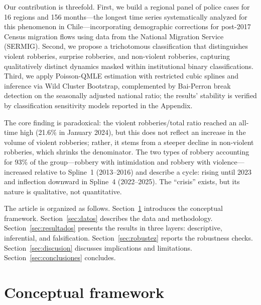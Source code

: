 \documentclass[pdflatex,sn-basic]{sn-jnl}
\begin{document}
Our contribution is threefold. First, we build a regional panel of police cases for
16 regions and 156 months---the longest time series systematically analyzed for this
phenomenon in Chile---incorporating demographic corrections for post-2017 Census migration
flows using data from the National Migration Service (SERMIG). Second, we propose a trichotomous
classification that distinguishes violent robberies, surprise robberies, and non-violent robberies,
capturing qualitatively distinct dynamics masked within institutional binary classifications. Third,
we apply Poisson-QMLE estimation with restricted cubic splines and inference via Wild Cluster Bootstrap,
complemented by Bai-Perron break detection on the seasonally adjusted national ratio; the results'
stability is verified by classification sensitivity models reported in the Appendix.

The core finding is paradoxical: the violent robberies/total ratio reached an all-time
high (21.6\% in January 2024), but this does not reflect an increase in the volume of violent robberies;
rather, it stems from a steeper decline in non-violent robberies, which shrinks the denominator. The two
types of robbery accounting for 93\% of the group---robbery with intimidation and robbery with violence---increased
relative to Spline~1 (2013--2016) and describe a cycle: rising until 2023 and inflection downward in Spline~4
(2022--2025). The ``crisis'' exists, but its nature is qualitative, not quantitative.

The article is organized as follows. Section~\ref{sec:marco} introduces the conceptual
framework. Section~\ref{sec:datos} describes the data and methodology. Section~\ref{sec:resultados}
presents the results in three layers: descriptive, inferential, and falsification. Section~\ref{sec:robustez}
reports the robustness checks. Section~\ref{sec:discusion} discusses implications and limitations.
Section~\ref{sec:conclusiones} concludes.


\section{Conceptual framework}
\label{sec:marco}
\end{document}
